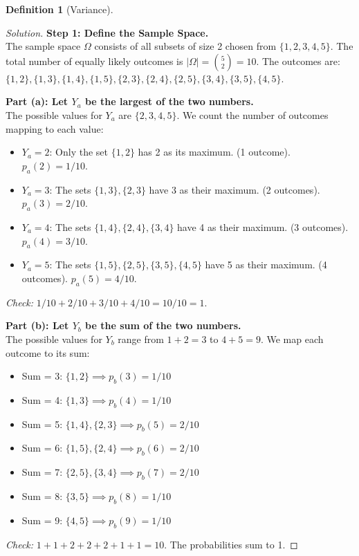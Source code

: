 \documentclass[11pt,letterpaper]{article}
\theoremstyle{definition}
\newtheorem{definition}{Definition}[section]
\theoremstyle{plain}
\theoremstyle{remark}
\begin{document}
\begin{definition}[Variance]
\begin{proof}[Solution]
\textbf{Step 1: Define the Sample Space.}\\
The sample space $\Omega$ consists of all subsets of size 2 chosen from $\{1, 2, 3, 4, 5\}$. 
The total number of equally likely outcomes is $|\Omega| = \binom{5}{2} = 10$.
The outcomes are: $\{1,2\}, \{1,3\}, \{1,4\}, \{1,5\}, \{2,3\}, \{2,4\}, \{2,5\}, \{3,4\}, \{3,5\}, \{4,5\}$.

\textbf{Part (a): Let $Y_a$ be the largest of the two numbers.}\\
The possible values for $Y_a$ are $\{2, 3, 4, 5\}$. We count the number of outcomes mapping to each value:
\begin{itemize}
    \item $Y_a = 2$: Only the set $\{1,2\}$ has 2 as its maximum. (1 outcome). $p_a(2) = 1/10$.
    \item $Y_a = 3$: The sets $\{1,3\}, \{2,3\}$ have 3 as their maximum. (2 outcomes). $p_a(3) = 2/10$.
    \item $Y_a = 4$: The sets $\{1,4\}, \{2,4\}, \{3,4\}$ have 4 as their maximum. (3 outcomes). $p_a(4) = 3/10$.
    \item $Y_a = 5$: The sets $\{1,5\}, \{2,5\}, \{3,5\}, \{4,5\}$ have 5 as their maximum. (4 outcomes). $p_a(5) = 4/10$.
\end{itemize}
\textit{Check:} $1/10 + 2/10 + 3/10 + 4/10 = 10/10 = 1$.

\textbf{Part (b): Let $Y_b$ be the sum of the two numbers.}\\
The possible values for $Y_b$ range from $1+2=3$ to $4+5=9$. We map each outcome to its sum:
\begin{itemize}
    \item Sum = 3: $\{1,2\} \implies p_b(3) = 1/10$
    \item Sum = 4: $\{1,3\} \implies p_b(4) = 1/10$
    \item Sum = 5: $\{1,4\}, \{2,3\} \implies p_b(5) = 2/10$
    \item Sum = 6: $\{1,5\}, \{2,4\} \implies p_b(6) = 2/10$
    \item Sum = 7: $\{2,5\}, \{3,4\} \implies p_b(7) = 2/10$
    \item Sum = 8: $\{3,5\} \implies p_b(8) = 1/10$
    \item Sum = 9: $\{4,5\} \implies p_b(9) = 1/10$
\end{itemize}
\textit{Check:} $1+1+2+2+2+1+1 = 10$. The probabilities sum to 1.
\end{proof}


\end{definition}
\end{document}
